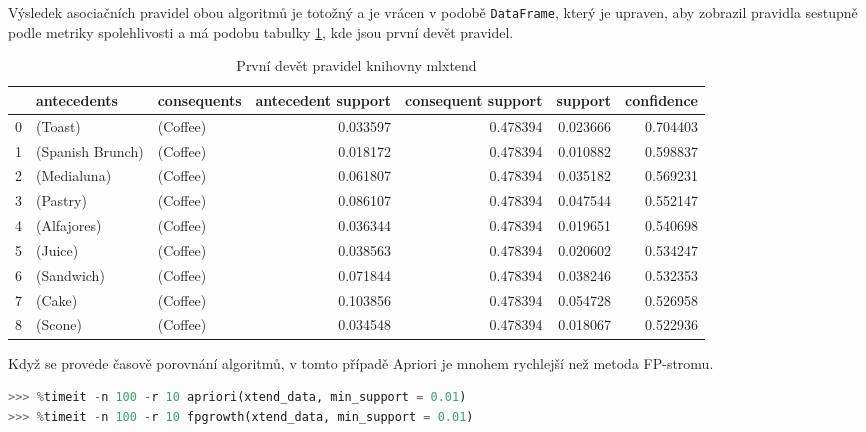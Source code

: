 Výsledek asociačních pravidel obou algoritmů je totožný a je vrácen v podobě \verb|DataFrame|, který je upraven, aby zobrazil pravidla sestupně podle metriky spolehlivosti a má podobu tabulky \ref{tab3}, kde jsou první devět pravidel.

\begin{table}[]
    \centering
    \small
    \begin{tabular}{lllrrrr}
\toprule
{} &       antecedents & consequents &  antecedent support &  consequent support &   support &  confidence \\
\midrule
0 &           (Toast) &    (Coffee) &   0.033597 &            0.478394 &  0.023666 &    0.704403 \\
1 &  (Spanish Brunch) &    (Coffee) &   0.018172 &            0.478394 &  0.010882 &    0.598837 \\
2 &       (Medialuna) &    (Coffee) &   0.061807 &            0.478394 &  0.035182 &    0.569231 \\
3 &          (Pastry) &    (Coffee) &   0.086107 &            0.478394 &  0.047544 &    0.552147 \\
4 &       (Alfajores) &    (Coffee) &   0.036344 &            0.478394 &  0.019651 &    0.540698 \\
5 &           (Juice) &    (Coffee) &   0.038563 &            0.478394 &  0.020602 &    0.534247 \\
6 &        (Sandwich) &    (Coffee) &   0.071844 &            0.478394 &  0.038246 &    0.532353 \\
7 &            (Cake) &    (Coffee) &   0.103856 &            0.478394 &  0.054728 &    0.526958 \\
8 &           (Scone) &    (Coffee) &   0.034548 &            0.478394 &  0.018067 &    0.522936 \\
\bottomrule
\end{tabular}
    \caption{První devět pravidel knihovny mlxtend}
    \label{tab3}
\end{table}

Když se provede časově porovnání algoritmů, v tomto případě Apriori je mnohem rychlejší než metoda FP-stromu.

\begin{mdframed}
\begin{lstlisting}[language=Python]
>>> %timeit -n 100 -r 10 apriori(xtend_data, min_support = 0.01)
>>> %timeit -n 100 -r 10 fpgrowth(xtend_data, min_support = 0.01)
\end{lstlisting}   
\end{mdframed}

